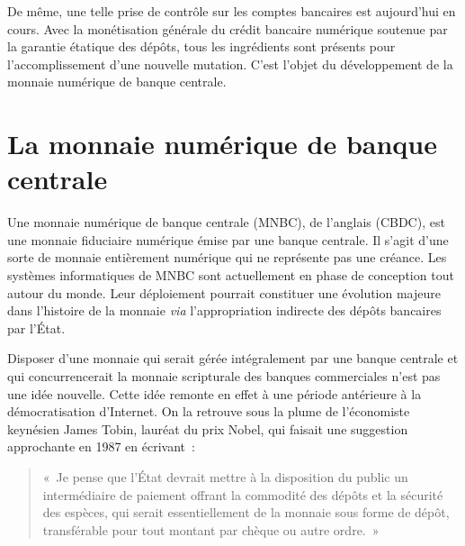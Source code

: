 De même, une telle prise de contrôle sur les comptes bancaires est aujourd'hui en cours. Avec la monétisation générale du crédit bancaire numérique soutenue par la garantie étatique des dépôts, tous les ingrédients sont présents pour l'accomplissement d'une nouvelle mutation. C'est l'objet du développement de la monnaie numérique de banque centrale.

\section*{La monnaie numérique de banque centrale}

Une monnaie numérique de banque centrale (MNBC), de l'anglais  (CBDC), est une monnaie fiduciaire numérique émise par une banque centrale. Il s'agit d'une sorte de monnaie entièrement numérique qui ne représente pas une créance. Les systèmes informatiques de MNBC sont actuellement en phase de conception tout autour du monde. Leur déploiement pourrait constituer une évolution majeure dans l'histoire de la monnaie \emph{via} l'appropriation indirecte des dépôts bancaires par l'État.


Disposer d'une monnaie qui serait gérée intégralement par une banque centrale et qui concurrencerait la monnaie scripturale des banques commerciales n'est pas une idée nouvelle. Cette idée remonte en effet à une période antérieure à la démocratisation d'Internet. On la retrouve sous la plume de l'économiste keynésien James Tobin, lauréat du prix Nobel, qui faisait une suggestion approchante en 1987 en écrivant~:

\begin{quote}
«~Je pense que l'État devrait mettre à la disposition du public un intermédiaire de paiement offrant la commodité des dépôts et la sécurité des espèces, qui serait essentiellement de la monnaie sous forme de dépôt, transférable pour tout montant par chèque ou autre ordre.~»
\end{quote} %

